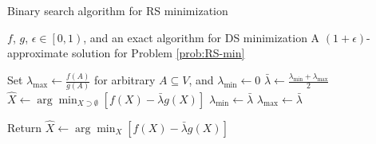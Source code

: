 \begin{algorithm}%
	\caption{Binary search algorithm for RS minimization }
	\label{alg:binary-search}
	\begin{algorithmic}[1]
		\renewcommand{\algorithmicrequire}{\textbf{Input:}}
		\renewcommand{\algorithmicensure}{\textbf{Output:}}
		\Require $ f $, $ g $, $ \epsilon \in \left[0, 1\right) $, and an exact algorithm for DS minimization
		\Ensure A $ (1 + \epsilon) $-approximate solution for Problem \ref{prob:RS-min}
		
		\State Set $ \lambda_{\max} \leftarrow \frac{f(A)}{g(A)} $ for arbitrary $ A \subseteq V $, and $ \lambda_{\min} \leftarrow 0 $
		\State $ \bar{\lambda} \leftarrow \frac{\lambda_{\min} + \lambda_{\max}}{2} $
		\State $ \hat{X} \leftarrow \arg \min_{X \supset \emptyset} \left[ f(X) - \bar{\lambda} g(X) \right] $
		\State $ \lambda_{\min} \leftarrow \bar{\lambda} $
		\Else
		\State $ \lambda_{\max} \leftarrow \bar{\lambda} $
		\EndIf
		\EndWhile
		
		\State Return $ \hat{X} \leftarrow \arg \min_X \left[ f(X) - \bar{\lambda} g(X) \right] $
	\end{algorithmic}
\end{algorithm}